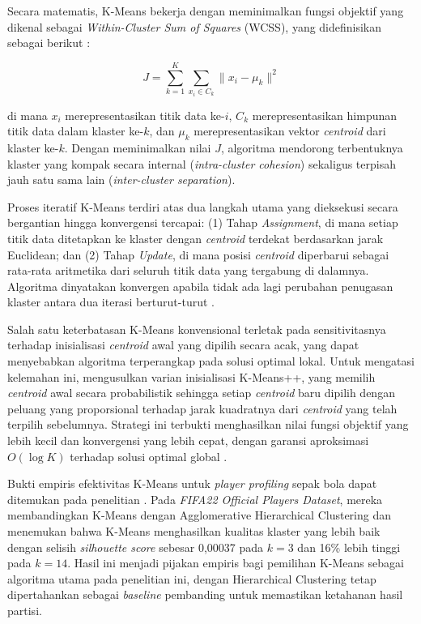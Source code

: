 Secara matematis, K-Means bekerja dengan meminimalkan fungsi objektif yang dikenal sebagai \emph{Within-Cluster Sum of Squares} (WCSS), yang didefinisikan sebagai berikut \parencite{lloyd1982}:

\begin{equation}
  J = \sum_{k=1}^{K} \sum_{x_i \in C_k} \lVert x_i - \mu_k \rVert^2
  \label{eq:wcss}
\end{equation}

\noindent di mana $x_i$ merepresentasikan titik data ke-$i$, $C_k$ merepresentasikan himpunan titik data dalam klaster ke-$k$, dan $\mu_k$ merepresentasikan vektor \emph{centroid} dari klaster ke-$k$. Dengan meminimalkan nilai $J$, algoritma mendorong terbentuknya klaster yang kompak secara internal (\emph{intra-cluster cohesion}) sekaligus terpisah jauh satu sama lain (\emph{inter-cluster separation}).

Proses iteratif K-Means terdiri atas dua langkah utama yang dieksekusi secara bergantian hingga konvergensi tercapai: (1) Tahap \emph{Assignment}, di mana setiap titik data ditetapkan ke klaster dengan \emph{centroid} terdekat berdasarkan jarak Euclidean; dan (2) Tahap \emph{Update}, di mana posisi \emph{centroid} diperbarui sebagai rata-rata aritmetika dari seluruh titik data yang tergabung di dalamnya. Algoritma dinyatakan konvergen apabila tidak ada lagi perubahan penugasan klaster antara dua iterasi berturut-turut \parencite{jain2010}.

Salah satu keterbatasan K-Means konvensional terletak pada sensitivitasnya terhadap inisialisasi \emph{centroid} awal yang dipilih secara acak, yang dapat menyebabkan algoritma terperangkap pada solusi optimal lokal. Untuk mengatasi kelemahan ini, \textcite{arthur2007} mengusulkan varian inisialisasi K-Means++, yang memilih \emph{centroid} awal secara probabilistik sehingga setiap \emph{centroid} baru dipilih dengan peluang yang proporsional terhadap jarak kuadratnya dari \emph{centroid} yang telah terpilih sebelumnya. Strategi ini terbukti menghasilkan nilai fungsi objektif yang lebih kecil dan konvergensi yang lebih cepat, dengan garansi aproksimasi $O(\log K)$ terhadap solusi optimal global \parencite{arthur2007}.

Bukti empiris efektivitas K-Means untuk \emph{player profiling} sepak bola dapat ditemukan pada penelitian \textcite{akif2022}. Pada \emph{FIFA22 Official Players Dataset}, mereka membandingkan K-Means dengan Agglomerative Hierarchical Clustering dan menemukan bahwa K-Means menghasilkan kualitas klaster yang lebih baik dengan selisih \emph{silhouette score} sebesar 0,00037 pada $k=3$ dan 16\% lebih tinggi pada $k=14$. Hasil ini menjadi pijakan empiris bagi pemilihan K-Means sebagai algoritma utama pada penelitian ini, dengan Hierarchical Clustering tetap dipertahankan sebagai \emph{baseline} pembanding untuk memastikan ketahanan hasil partisi.

